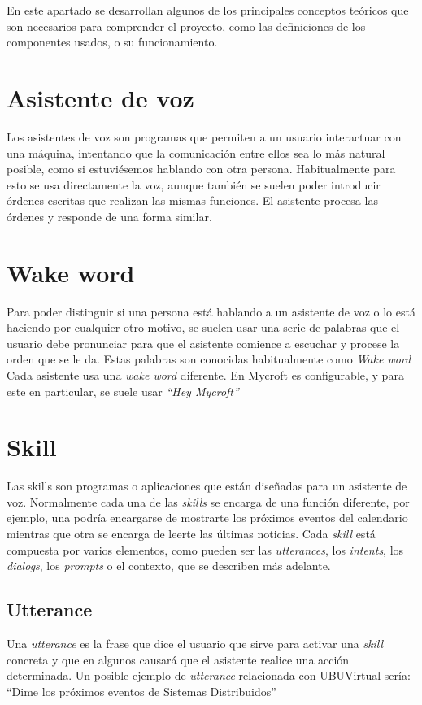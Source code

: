 
En este apartado se desarrollan algunos de los principales conceptos teóricos que son necesarios para comprender el proyecto, como las definiciones de los componentes usados, o su funcionamiento.

\section{Asistente de voz}
Los asistentes de voz \cite{virtualassistant} son programas que permiten a un usuario interactuar con una máquina, intentando que la comunicación entre ellos sea lo más natural posible, como si estuviésemos hablando con otra persona. Habitualmente para esto se usa directamente la voz, aunque también se suelen poder introducir órdenes escritas que realizan las mismas funciones. El asistente procesa las órdenes y responde de una forma similar.

\section{Wake word}
Para poder distinguir si una persona está hablando a un asistente de voz o lo está haciendo por cualquier otro motivo, se suelen usar una serie de palabras que el usuario debe pronunciar para que el asistente comience a escuchar y procese la orden que se le da. Estas palabras son conocidas habitualmente como \textit{Wake word} \cite{wakeword} Cada asistente usa una \textit{wake word} diferente. En Mycroft es configurable, y para este en particular, se suele usar \textit{``Hey Mycroft''}

\section{Skill}
Las skills \cite{skills} son programas o aplicaciones que están diseñadas para un asistente de voz. Normalmente cada una de las \textit{skills} se encarga de una función diferente, por ejemplo, una podría encargarse de mostrarte los próximos eventos del calendario mientras que otra se encarga de leerte las últimas noticias. Cada \textit{skill} está compuesta por varios elementos, como pueden ser las \textit{utterances}, los \textit{intents}, los \textit{dialogs}, los \textit{prompts} o el contexto, que se describen más adelante.

\subsection{Utterance}
Una \textit{utterance} \cite{mycroftglossary} es la frase que dice el usuario que sirve para activar una \textit{skill} concreta y que en algunos causará que el asistente realice una acción determinada. Un posible ejemplo de \textit{utterance} relacionada con UBUVirtual sería: ``Dime los próximos eventos de Sistemas Distribuidos''

